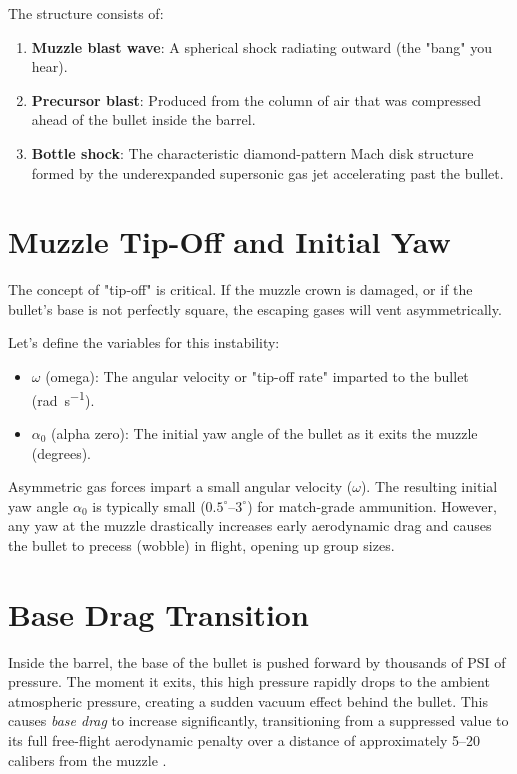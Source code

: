 \documentclass[11pt,twoside,openright]{report}
\begin{document}
The structure consists of:
\begin{enumerate}
  \item \textbf{Muzzle blast wave}: A spherical shock radiating outward (the "bang" you hear).
  \item \textbf{Precursor blast}: Produced from the column of air that was compressed ahead of the bullet inside the barrel.
  \item \textbf{Bottle shock}: The characteristic diamond-pattern Mach disk structure formed by the underexpanded supersonic gas jet accelerating past the bullet.
\end{enumerate}

\section{Muzzle Tip-Off and Initial Yaw}

The concept of "tip-off" is critical. If the muzzle crown is damaged, or if the bullet's base is not perfectly square, the escaping gases will vent asymmetrically. 

Let's define the variables for this instability:
\begin{itemize}[noitemsep]
    \item $\omega$ (omega): The angular velocity or "tip-off rate" imparted to the bullet (\si{\radian\per\second}).
    \item $\alpha_0$ (alpha zero): The initial yaw angle of the bullet as it exits the muzzle (degrees).
\end{itemize}

Asymmetric gas forces impart a small angular velocity ($\omega$). The resulting initial yaw angle $\alpha_0$ is typically small ($0.5^\circ$--$3^\circ$) for match-grade ammunition. However, any yaw at the muzzle drastically increases early aerodynamic drag and causes the bullet to precess (wobble) in flight, opening up group sizes.

\section{Base Drag Transition}

Inside the barrel, the base of the bullet is pushed forward by thousands of PSI of pressure. The moment it exits, this high pressure rapidly drops to the ambient atmospheric pressure, creating a sudden vacuum effect behind the bullet. This causes \emph{base drag} to increase significantly, transitioning from a suppressed value to its full free-flight aerodynamic penalty over a distance of approximately 5--20 calibers from the muzzle \citep{mccoy1999modern}.
\end{document}
